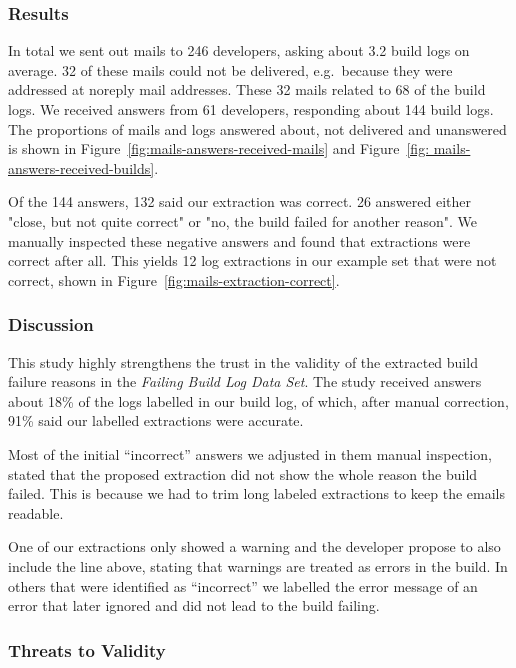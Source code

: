 \documentclass[\myrootdir/main.tex]{subfiles}
\begin{document}
\subsubsection{Results}
In total we sent out mails to 246 developers, asking about 3.2 build logs on average.
32 of these mails could not be delivered, e.g.\ because they were addressed at noreply mail addresses.
These 32 mails related to 68 of the build logs.
We received answers from 61 developers, responding about 144 build logs.
The proportions of mails and logs answered about, not delivered and unanswered is shown in Figure~\ref{fig:mails-answers-received-mails} and Figure~\ref{fig: mails-answers-received-builds}.

Of the 144 answers, 132 said our extraction was correct.
26 answered either "close, but not quite correct" or "no, the build failed for another reason".
We manually inspected these negative answers and found that extractions were correct after all.
This yields 12 log extractions in our example set that were not correct, shown in Figure~\ref{fig:mails-extraction-correct}.

\subsubsection{Discussion}
This study highly strengthens the trust in the validity of the extracted build failure reasons in the \emph{Failing Build Log Data Set}.
The study received answers about 18\% of the logs labelled in our build log, of which, after manual correction, 91\% said our labelled extractions were accurate.

Most of the initial ``incorrect'' answers we adjusted in them manual inspection, stated that the proposed extraction did not show the whole reason the build failed.
This is because we had to trim long labeled extractions to keep the emails readable.

One of our extractions only showed a warning and the developer propose to also include the line above, stating that warnings are treated as errors in the build.
In others that were identified as ``incorrect'' we labelled the error message of an error that later ignored and did not lead to the build failing.

\subsubsection{Threats to Validity}
\end{document}
